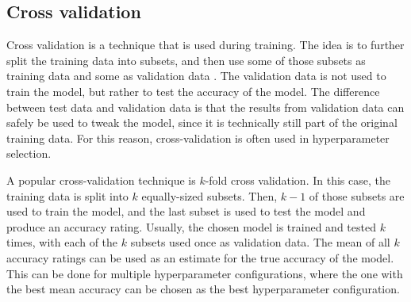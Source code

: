 \subsection{Cross validation}
Cross validation is a technique that is used during training.  The idea is to further split the training data into subsets, and then use some of those subsets as training data and some as validation data \cite{refaeilzadeh2009}.  The validation data is not used to train the model, but rather to test the accuracy of the model.  The difference between test data and validation data is that the results from validation data can safely be used to tweak the model, since it is technically still part of the original training data.  For this reason, cross-validation is often used in hyperparameter selection.

A popular cross-validation technique is $k$-fold cross validation.  In this case, the training data is split into $k$ equally-sized subsets.  Then, $k-1$ of those subsets are used to train the model, and the last subset is used to test the model and produce an accuracy rating.  Usually, the chosen model is trained and tested $k$ times, with each of the $k$ subsets used once as validation data.  The mean of all $k$ accuracy ratings can be used as an estimate for the true accuracy of the model.  This can be done for multiple hyperparameter configurations, where the one with the best mean accuracy can be chosen as the best hyperparameter configuration.

